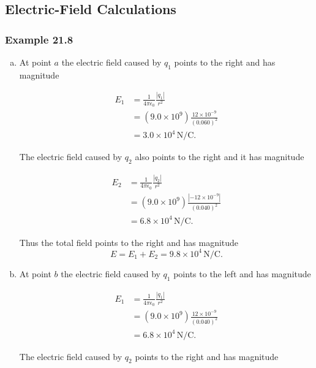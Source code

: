 \documentclass{article}
\begin{document}
\subsection{Electric-Field Calculations}

\subsubsection{Example 21.8}

\begin{enumerate}[a)]
  \item At point $a$ the electric field caused by $q_1$ points to the right and has magnitude

        \begin{align*}
          E_1 & = \frac{1}{4\pi\epsilon_0} \frac{|q_1|}{r^2}            \\
              & = (9.0 \times 10^9) \frac{12 \times 10^{-9}}{(0.060)^2} \\
              & = 3.0 \times 10^4\,\textrm{N}/\textrm{C}.
        \end{align*}

        The electric field caused by $q_2$ also points to the right and it has magnitude

        \begin{align*}
          E_2 & = \frac{1}{4\pi\epsilon_0} \frac{|q_2|}{r^2}               \\
              & = (9.0 \times 10^9) \frac{|-12 \times 10^{-9}|}{(0.040)^2} \\
              & = 6.8 \times 10^4\,\textrm{N}/\textrm{C}.
        \end{align*}

        Thus the total field points to the right and has magnitude \[E = E_1 + E_2 = 9.8 \times 10^4\,\textrm{N}/\textrm{C}.\]

  \item At point $b$ the electric field caused by $q_1$ points to the left and has magnitude

        \begin{align*}
          E_1 & = \frac{1}{4\pi\epsilon_0} \frac{|q_1|}{r^2}            \\
              & = (9.0 \times 10^9) \frac{12 \times 10^{-9}}{(0.040)^2} \\
              & = 6.8 \times 10^4\,\textrm{N}/\textrm{C}.
        \end{align*}

        The electric field caused by $q_2$ points to the right and has magnitude


\end{enumerate}
\end{document}
